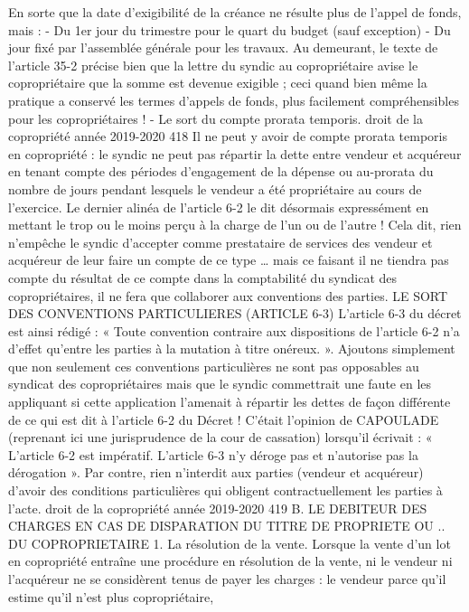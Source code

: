 En sorte que la date d’exigibilité de la créance ne résulte plus de l’appel de fonds, mais :
- Du 1er jour du trimestre pour le quart du budget (sauf exception)
- Du jour fixé par l’assemblée générale pour les travaux.
Au demeurant, le texte de l’article 35-2 précise bien que la lettre du syndic au copropriétaire avise le copropriétaire que la somme est devenue exigible ; ceci quand bien même la pratique a conservé les termes d’appels de fonds, plus facilement compréhensibles pour les copropriétaires !
- Le sort du compte prorata temporis.
droit de la copropriété année 2019-2020
418
Il ne peut y avoir de compte prorata temporis en copropriété : le syndic ne peut pas répartir la dette entre vendeur et acquéreur en tenant compte des périodes d’engagement de la dépense ou au-prorata du nombre de jours pendant lesquels le vendeur a été propriétaire au cours de l’exercice.
Le dernier alinéa de l’article 6-2 le dit désormais expressément en mettant le trop ou le moins perçu à la charge de l’un ou de l’autre !
Cela dit, rien n’empêche le syndic d’accepter comme prestataire de services des vendeur et acquéreur de leur faire un compte de ce type … mais ce faisant il ne tiendra pas compte du résultat de ce compte dans la comptabilité du syndicat des copropriétaires, il ne fera que collaborer aux conventions des parties.
LE SORT DES CONVENTIONS PARTICULIERES (ARTICLE 6-3)
L’article 6-3 du décret est ainsi rédigé :
« Toute convention contraire aux dispositions de l'article 6-2 n'a d'effet qu'entre les parties à la mutation à titre onéreux. ».
Ajoutons simplement que non seulement ces conventions particulières ne sont pas opposables au syndicat des copropriétaires mais que le syndic commettrait une faute en les appliquant si cette application l’amenait à répartir les dettes de façon différente de ce qui est dit à l’article 6-2 du Décret !
C’était l’opinion de CAPOULADE (reprenant ici une jurisprudence de la cour de cassation) lorsqu’il écrivait : « L’article 6-2 est impératif. L’article 6-3 n’y déroge pas et n’autorise pas la dérogation ».
Par contre, rien n’interdit aux parties (vendeur et acquéreur) d’avoir des conditions particulières qui obligent contractuellement les parties à l'acte.
droit de la copropriété année 2019-2020
419
B. LE DEBITEUR DES CHARGES EN CAS DE DISPARATION DU TITRE DE PROPRIETE OU .. DU COPROPRIETAIRE
1. La résolution de la vente.
Lorsque la vente d'un lot en copropriété entraîne une procédure en résolution de la vente, ni le vendeur ni l'acquéreur ne se considèrent tenus de payer les charges :
le vendeur parce qu'il estime qu'il n'est plus copropriétaire,
